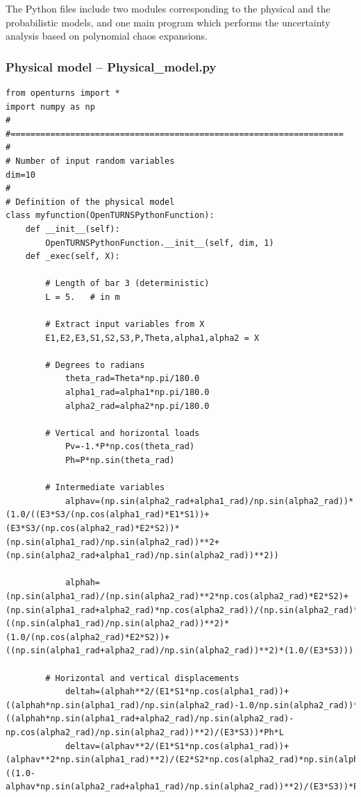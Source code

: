 \documentclass[11pt]{article}
\begin{document}
The Python files include two modules corresponding to the physical and the probabilistic models, and one main program which performs the uncertainty analysis based on polynomial chaos expansions.  

\subsubsection{Physical model -- \textsf{Physical\_model.py}}

\begin{lstlisting}
from openturns import *
import numpy as np
#
#===================================================================
#
# Number of input random variables
dim=10
#
# Definition of the physical model
class myfunction(OpenTURNSPythonFunction):
	def __init__(self):
		OpenTURNSPythonFunction.__init__(self, dim, 1)
	def _exec(self, X):	
			
		# Length of bar 3 (deterministic)
		L = 5.   # in m
		
		# Extract input variables from X
		E1,E2,E3,S1,S2,S3,P,Theta,alpha1,alpha2 = X	
		
		# Degrees to radians
        	theta_rad=Theta*np.pi/180.0
        	alpha1_rad=alpha1*np.pi/180.0
        	alpha2_rad=alpha2*np.pi/180.0		

		# Vertical and horizontal loads
        	Pv=-1.*P*np.cos(theta_rad)
        	Ph=P*np.sin(theta_rad)
		
		# Intermediate variables
        	alphav=(np.sin(alpha2_rad+alpha1_rad)/np.sin(alpha2_rad))*(1.0/((E3*S3/(np.cos(alpha1_rad)*E1*S1))+(E3*S3/(np.cos(alpha2_rad)*E2*S2))*(np.sin(alpha1_rad)/np.sin(alpha2_rad))**2+(np.sin(alpha2_rad+alpha1_rad)/np.sin(alpha2_rad))**2))		
				
        	alphah=(np.sin(alpha1_rad)/(np.sin(alpha2_rad)**2*np.cos(alpha2_rad)*E2*S2)+(np.sin(alpha1_rad+alpha2_rad)*np.cos(alpha2_rad))/(np.sin(alpha2_rad)**2*E3*S3))/(1.0/(np.cos(alpha1_rad)*E1*S1)+((np.sin(alpha1_rad)/np.sin(alpha2_rad))**2)*(1.0/(np.cos(alpha2_rad)*E2*S2))+((np.sin(alpha1_rad+alpha2_rad)/np.sin(alpha2_rad))**2)*(1.0/(E3*S3)))

		# Horizontal and vertical displacements
        	deltah=(alphah**2/(E1*S1*np.cos(alpha1_rad))+((alphah*np.sin(alpha1_rad)/np.sin(alpha2_rad)-1.0/np.sin(alpha2_rad))**2)/(E2*S2*np.cos(alpha2_rad))+((alphah*np.sin(alpha1_rad+alpha2_rad)/np.sin(alpha2_rad)-np.cos(alpha2_rad)/np.sin(alpha2_rad))**2)/(E3*S3))*Ph*L
        	deltav=(alphav**2/(E1*S1*np.cos(alpha1_rad))+(alphav**2*np.sin(alpha1_rad)**2)/(E2*S2*np.cos(alpha2_rad)*np.sin(alpha2_rad)**2)+((1.0-alphav*np.sin(alpha2_rad+alpha1_rad)/np.sin(alpha2_rad))**2)/(E3*S3))*Pv*L
		

\end{lstlisting}
\end{document}

